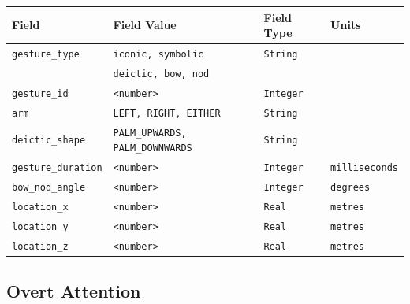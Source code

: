 \documentclass{CSSRforAfrica}
\begin{document}
{{\begin{center}
\begin{tabularx}{\linewidth}{| l | X | l | l |}
\hline 
{\small Field }                               & {\small Field Value }                            &  {\small Field Type}   &  {\small Units}    \\
\hline
{\footnotesize \verb+gesture_type+}  & {\footnotesize \texttt{iconic, symbolic}}    & {\footnotesize \texttt{String}} & {\footnotesize } \\ 
{\footnotesize }  & {\footnotesize \texttt{deictic, bow, nod}}    & {\footnotesize } & {\footnotesize } \\ 
\hline
{\footnotesize \verb+gesture_id+}  & {\footnotesize \texttt{<number>}}    & {\footnotesize \texttt{Integer}} & {\footnotesize } \\ 
\hline
{\footnotesize \verb+arm+}  & {\footnotesize \texttt{LEFT, RIGHT, EITHER}}    & {\footnotesize \texttt{String}} & {\footnotesize } \\ 
\hline
{\footnotesize \verb+deictic_shape+}  & {\footnotesize \texttt{PALM\_UPWARDS, PALM\_DOWNWARDS}}    & {\footnotesize \texttt{String}} & {\footnotesize } \\ 
\hline
{\footnotesize \verb+gesture_duration+}  & {\footnotesize \texttt{<number>}}    & {\footnotesize \texttt{Integer}} & {\footnotesize \texttt{milliseconds}} \\ 
\hline
{\footnotesize \verb+bow_nod_angle+}  & {\footnotesize \texttt{<number>}}    & {\footnotesize \texttt{Integer}} & {\footnotesize \texttt{degrees}} \\ 
\hline
{\footnotesize \verb+location_x+}  & {\footnotesize \texttt{<number>}}    & {\footnotesize \texttt{Real}} & {\footnotesize \texttt{metres}} \\ 
\hline
{\footnotesize \verb+location_y+}  & {\footnotesize \texttt{<number>}}    & {\footnotesize \texttt{Real}} & {\footnotesize \texttt{metres}} \\ 
\hline
{\footnotesize \verb+location_z+}  & {\footnotesize \texttt{<number>}}    & {\footnotesize \texttt{Real}} & {\footnotesize \texttt{metres}} \\ 
\hline
\end{tabularx}
\end{center}






\newpage

\subsection{Overt Attention }

}}
\end{document}
